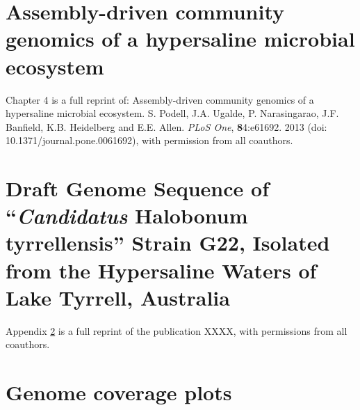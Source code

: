 \documentclass[12pt,chapterheads]{ucsd}
\begin{document}
\chapter{Assembly-driven community genomics of a hypersaline microbial ecosystem}

Chapter 4 is a full reprint of: Assembly-driven community genomics of a hypersaline microbial ecosystem. S. Podell, J.A. Ugalde, P. Narasingarao, J.F. Banfield, K.B. Heidelberg and E.E. Allen. \textit{PLoS One}, \textbf{8}4:e61692. 2013 (doi: 10.1371/journal.pone.0061692), with permission from all coauthors.










\appendix

\chapter{Draft Genome Sequence of “\textit{Candidatus} Halobonum tyrrellensis” Strain G22, Isolated from the Hypersaline Waters of Lake Tyrrell, Australia}\label{G22Genome}

Appendix \ref{G22Genome} is a full reprint of the publication XXXX, with permissions from all coauthors.

\chapter{Genome coverage plots}


%

\listoftodos


\end{document}
